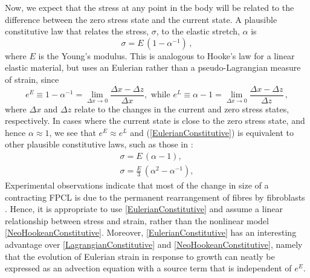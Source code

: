 Now, we expect that the stress at any point in the body will be related to the difference between the zero stress state and the current state. A plausible constitutive law that relates the stress, $\sigma$, to the elastic stretch, $\alpha$ is
\begin{equation}
 \label{EulerianConstitutive}
 \sigma = E \, \left(1 - \alpha^{-1}\right)\,,
\end{equation}
where $E$ is the Young's modulus.
This is analogous to Hooke's law for a linear elastic material, but uses an Eulerian rather than a pseudo-Lagrangian measure of strain, since
\[
e^{E} \equiv 1 - \alpha^{-1} = \lim_{\Delta x \rightarrow 0} \frac{\Delta x - \Delta z}{\Delta x}, \text{ while }  e^{L} \equiv \alpha - 1 = \lim_{\Delta x \rightarrow 0} \frac{\Delta x - \Delta z}{\Delta z}\,,
\]
where $\Delta x$ and $\Delta z$ relate to the changes in the current and zero stress states, respectively. In cases where the current state is close to the zero stress state, and hence $\alpha \approx 1$, we see that $e^{E}\approx e^{L}$ and (\ref{EulerianConstitutive})
is equivalent to other plausible constitutive laws, such as those in \citet{Goriely2011}:
\begin{gather}
 \sigma = E \, (\alpha - 1), \label{LagrangianConstitutive}\\[6pt]
 \sigma = \frac{E}{3} \, \left(\alpha^2 - \alpha^{-1}\right), \label{NeoHookeanConstitutive}
\end{gather}
Experimental observations indicate that most of the change in size of a contracting FPCL is due to the permanent rearrangement of fibres by fibroblasts \citep{Guidry1985}. Hence, it is appropriate to use \eqref{EulerianConstitutive} and assume a linear relationship between stress and strain, rather than the nonlinear model \eqref{NeoHookeanConstitutive}. Moreover,
\eqref{EulerianConstitutive} has an interesting advantage over \eqref{LagrangianConstitutive} and \eqref{NeoHookeanConstitutive}, namely that the evolution of Eulerian strain in response to growth can neatly be expressed as an advection equation with a source term that is independent of $e^E$.

